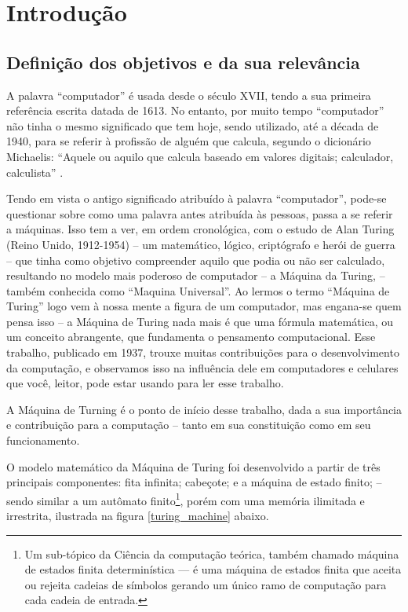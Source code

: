\section{Introdução} 
\label{introduction}
\subsection{Definição dos objetivos e da sua relevância}
A palavra ``computador'' é usada desde o século XVII, tendo a sua primeira referência escrita datada de 1613. No entanto, por muito tempo ``computador'' não tinha o mesmo significado que tem hoje, sendo utilizado, até a década de 1940, para se referir à profissão de alguém que calcula, segundo o dicionário Michaelis: ``Aquele ou aquilo que calcula baseado em valores digitais; calculador, calculista'' \cite{4}.

Tendo em vista o antigo significado atribuído à palavra ``computador'', pode-se questionar sobre como uma palavra antes atribuída às pessoas, passa a se referir a máquinas. Isso tem a ver, em ordem cronológica, com o estudo de Alan Turing (Reino Unido, 1912-1954) – um matemático, lógico, criptógrafo e herói de guerra – que tinha como objetivo compreender aquilo que podia ou não ser calculado, resultando no modelo mais poderoso de computador – a Máquina da Turing, – também conhecida como ``Maquina Universal''. Ao lermos o termo ``Máquina de Turing'' logo vem à nossa mente a figura de um computador, mas engana-se quem pensa isso – a Máquina de Turing nada mais é que uma fórmula matemática, ou um conceito abrangente, que fundamenta o pensamento computacional. Esse trabalho, publicado em 1937, trouxe muitas contribuições para o desenvolvimento da computação, e observamos isso na influência dele em computadores e celulares que você, leitor, pode estar usando para ler esse  trabalho.  

A Máquina de Turning é o ponto de início desse trabalho, dada a sua importância e contribuição para a computação – tanto em sua constituição como em seu funcionamento. 

O modelo matemático da Máquina de Turing foi desenvolvido a partir de três principais componentes: fita infinita; cabeçote; e a máquina de estado finito; – sendo similar a um autômato finito\footnote{Um sub-tópico da Ciência da computação teórica, também chamado máquina de estados finita determinística — é uma máquina de estados finita que aceita ou rejeita cadeias de símbolos gerando um único ramo de computação para cada cadeia de entrada.}, porém com uma memória ilimitada e irrestrita, ilustrada na figura \ref{turing_machine} abaixo.

